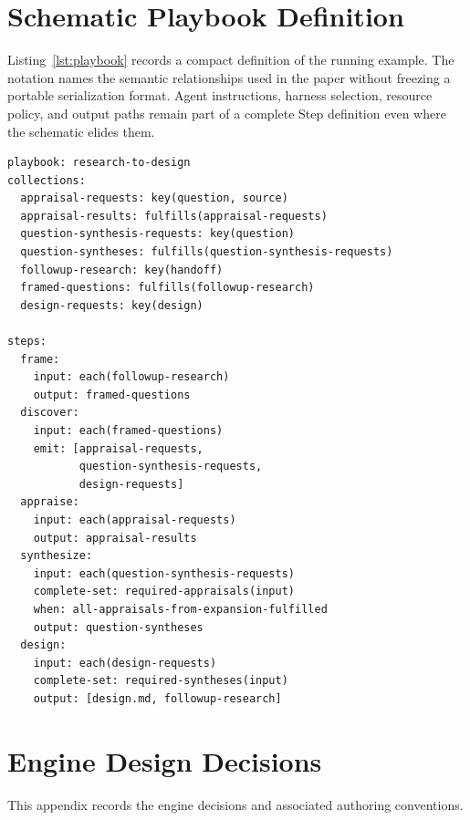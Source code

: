 \documentclass[letterpaper]{article}
\theoremstyle{definition}
\begin{document}
{\small

}

\clearpage
\appendix
\section{Schematic Playbook Definition}
\label{app:playbook-definition}

Listing~\ref{lst:playbook} records a compact definition of the running example.
The notation names the semantic relationships used in the paper without
freezing a portable serialization format. Agent instructions, harness
selection, resource policy, and output paths remain part of a complete Step
definition even where the schematic elides them.

\begin{listing}[H]
\begin{lstlisting}
playbook: research-to-design
collections:
  appraisal-requests: key(question, source)
  appraisal-results: fulfills(appraisal-requests)
  question-synthesis-requests: key(question)
  question-syntheses: fulfills(question-synthesis-requests)
  followup-research: key(handoff)
  framed-questions: fulfills(followup-research)
  design-requests: key(design)

steps:
  frame:
    input: each(followup-research)
    output: framed-questions
  discover:
    input: each(framed-questions)
    emit: [appraisal-requests,
           question-synthesis-requests,
           design-requests]
  appraise:
    input: each(appraisal-requests)
    output: appraisal-results
  synthesize:
    input: each(question-synthesis-requests)
    complete-set: required-appraisals(input)
    when: all-appraisals-from-expansion-fulfilled
    output: question-syntheses
  design:
    input: each(design-requests)
    complete-set: required-syntheses(input)
    output: [design.md, followup-research]
\end{lstlisting}
\caption{Schematic research-to-design Playbook. An initial agenda is represented
as the first member of \texttt{followup-research}; later Design executions may
emit another member or an explicitly empty collection.}
\label{lst:playbook}
\end{listing}

\clearpage
\section{Engine Design Decisions}
\label{app:engine-design-decisions}

This appendix records the engine decisions and associated authoring conventions.
\end{document}
